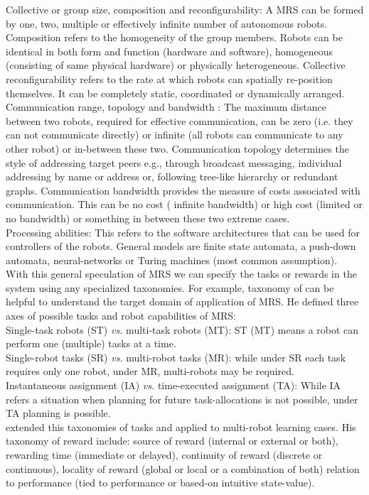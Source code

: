 Collective or group size, composition and reconfigurability: A MRS can be formed by one, two, multiple or effectively infinite number of autonomous robots. Composition refers to the homogeneity of the group members. Robots can be identical in both form and function (hardware and software), homogeneous (consisting of same physical hardware) or physically heterogeneous. Collective reconfigurability refers to the rate at which robots can spatially re-position themselves. It can be completely static, coordinated or dynamically arranged.\\
Communication range, topology and bandwidth : The maximum distance  between two robots, required for effective communication,  can be zero (i.e. they can not communicate directly) or infinite (all robots can communicate to any other robot) or in-between these two. Communication topology determines the style of addressing target peers e.g., through broadcast messaging, individual addressing by name or address or,  following tree-like hierarchy or redundant graphs. Communication bandwidth provides the measure of costs associated with communication. This can be no cost ( infinite bandwidth) or high cost (limited or no bandwidth) or something in between these two extreme cases.\\
Processing abilities: This refers to the software architectures that can be used for controllers of the robots. General models are finite state automata, a push-down automata, neural-networks or Turing  machines (most common assumption). \\
With this general speculation of MRS we can specify the tasks or rewards in the system using any specialized taxonomies. For example, taxonomy of  can be helpful to understand the target domain of application of MRS. He defined three axes of possible tasks and  robot capabilities of MRS:\\
Single-task robots (ST) {\em vs.} multi-task robots (MT): ST (MT) means a robot can perform one (multiple) tasks at a time.\\
Single-robot tasks (SR) {\em vs.} multi-robot tasks (MR): while under SR each task requires only one robot, under MR, multi-robots may be required.\\
Instantaneous assignment (IA) {\em vs.} time-executed assignment (TA): While IA refers a situation when planning for future task-allocations is not possible, under TA planning is possible.\\
 extended this taxonomies of tasks and applied to multi-robot learning cases. His taxonomy of reward include: source of reward (internal or external or both), rewarding time (immediate or delayed), continuity of reward (discrete or continuous), locality of reward (global or local or a combination of both) relation to performance (tied to performance or based-on intuitive state-value).\\
